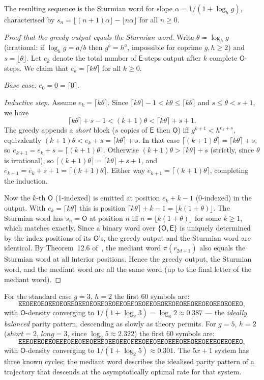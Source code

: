 \documentclass[12pt]{article}
\theoremstyle{definition}
\theoremstyle{remark}
\theoremstyle{plain}
\newcommand{\OO}{\mathsf{O}}
\newcommand{\EE}{\mathsf{E}}
\begin{document}
The resulting sequence is the Sturmian word for slope
$\alpha = 1/(1 + \log_h g)$, characterised by
$s_n = \lfloor(n+1)\alpha\rfloor - \lfloor n\alpha\rfloor$ for all $n \geq 0$.

\begin{proof}[Proof that the greedy output equals the Sturmian word]
Write $\theta = \log_h g$ (irrational: if $\log_h g = a/b$ then $g^b = h^a$,
impossible for coprime $g, h \geq 2$) and $s = \lfloor\theta\rfloor$.
Let $e_k$ denote the total number of $\EE$-steps output after $k$ complete $\OO$-steps.
We claim that $e_k = \lceil k\theta \rceil$ for all $k \geq 0$.

\emph{Base case.} $e_0 = 0 = \lceil 0 \rceil$. \checkmark

\emph{Inductive step.} Assume $e_k = \lceil k\theta \rceil$.
Since $\lceil k\theta \rceil - 1 < k\theta \leq \lceil k\theta \rceil$ and
$s \leq \theta < s+1$, we have
\[
  \lceil k\theta \rceil + s - 1 < (k+1)\theta < \lceil k\theta \rceil + s + 1.
\]
The greedy appends a \emph{short} block ($s$ copies of $\EE$ then $\OO$) iff
$g^{k+1} < h^{e_k + s}$, equivalently $(k+1)\theta < e_k + s = \lceil k\theta \rceil + s$.
In that case $\lceil(k+1)\theta\rceil = \lceil k\theta \rceil + s$,
so $e_{k+1} = e_k + s = \lceil(k+1)\theta\rceil$.
Otherwise $(k+1)\theta > \lceil k\theta\rceil + s$ (strictly, since $\theta$ is irrational),
so $\lceil(k+1)\theta\rceil = \lceil k\theta \rceil + s + 1$,
and $e_{k+1} = e_k + s + 1 = \lceil(k+1)\theta\rceil$.
Either way $e_{k+1} = \lceil(k+1)\theta\rceil$, completing the induction.

Now the $k$-th $\OO$ (1-indexed) is emitted at position $e_k + k - 1$ (0-indexed) in the output.
With $e_k = \lceil k\theta \rceil$ this is position
$\lceil k\theta \rceil + k - 1 = \lfloor k(1+\theta) \rfloor$.
The Sturmian word has $s_n = \OO$ at position $n$ iff $n = \lfloor k(1+\theta) \rfloor$
for some $k \geq 1$, which matches exactly.
Since a binary word over $\{\OO, \EE\}$ is uniquely determined by the index positions
of its $\OO$'s, the greedy output and the Sturmian word are identical.
By Theorem~12.6 of~\cite{paper76}, the mediant word $\pi(r_{2d+1})$ also equals the
Sturmian word at all interior positions.
Hence the greedy output, the Sturmian word, and the mediant word are all the same
word (up to the final letter of the mediant word).
\end{proof}

For the standard case $g = 3$, $h = 2$ the first 60 symbols are:
\[
  \mathtt{EEOEEOEOEEOEOEEOEEOEOEEOEOEEOEEOEOEEOEOEEOEOEEOEEOEOEEOEOEEO},
\]
with $\OO$-density converging to $1/(1+\log_2 3) = \log_6 2 \approx 0.387$ ---
the \emph{ideally balanced} parity pattern, descending as slowly as theory
permits.
For $g = 5$, $h = 2$ ($\mathit{short} = 2$, $\mathit{long} = 3$, since
$\log_2 5 \approx 2.322$) the first 60 symbols are:
\[
  \mathtt{EEEOEEOEEOEEEOEEOEEOEEEOEEOEEOEEEOEEOEEOEEEOEEOEEOEEEOEEOEEO},
\]
with $\OO$-density converging to $1/(1+\log_2 5) \approx 0.301$.
The $5x+1$ system has three known cycles; the mediant word describes the
idealised parity pattern of a trajectory that descends at the asymptotically
optimal rate for that system.
\end{document}
